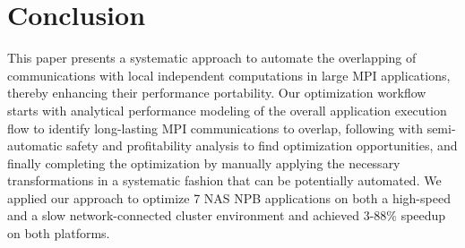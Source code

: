 \section{Conclusion}
\label{sec-concl}

This paper presents a systematic approach to automate the overlapping of  communications with local independent computations in large MPI applications, thereby enhancing their performance portability.
Our optimization workflow starts with analytical performance modeling of the overall application execution flow to identify long-lasting MPI communications to overlap, following with semi-automatic safety and profitability analysis to find optimization opportunities, and finally completing the optimization by manually applying the necessary transformations in a systematic fashion that can be potentially automated. 
We applied our approach to optimize 7 NAS NPB applications on both a high-speed and a slow network-connected cluster environment and achieved 3-88\% speedup on both platforms.




